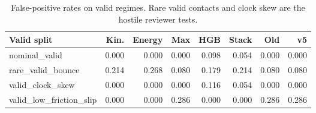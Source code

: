 \begin{table}[t]
\centering
\caption{False-positive rates on valid regimes. Rare valid contacts and clock skew are the hostile reviewer tests.}
\label{tab:valid-fpr}
\scriptsize
\setlength{\tabcolsep}{2.0pt}
\begin{tabular}{lrrrrrrr}
\toprule
Valid split & Kin. & Energy & Max & HGB & Stack & Old & v5 \\
\midrule
nominal\_valid & 0.000 & 0.000 & 0.000 & 0.098 & 0.054 & 0.000 & 0.000 \\
rare\_valid\_bounce & 0.214 & 0.268 & 0.080 & 0.179 & 0.214 & 0.080 & 0.080 \\
valid\_clock\_skew & 0.000 & 0.000 & 0.000 & 0.116 & 0.054 & 0.000 & 0.000 \\
valid\_low\_friction\_slip & 0.000 & 0.000 & 0.286 & 0.000 & 0.000 & 0.286 & 0.286 \\
\bottomrule
\end{tabular}
\end{table}
